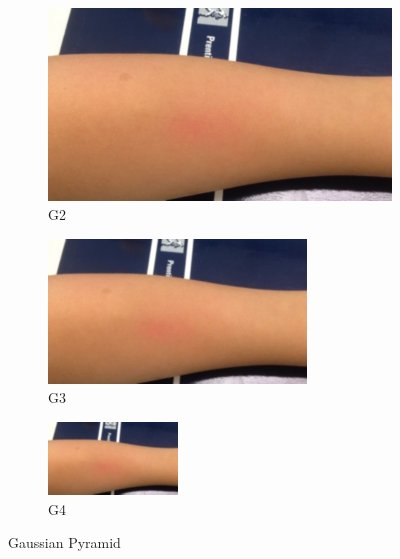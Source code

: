 \begin{figure}[!h]
\begin{subfigure}{.3\textwidth}
  \centering
  \includegraphics[scale=0.16]{img/eulerian/sample/1}
  \caption{G2}
  \label{fig:sub2}
\end{subfigure}
\begin{subfigure}{.3\textwidth}
  \centering
  \includegraphics[scale=0.16]{img/eulerian/sample/2}
  \caption{G3}
  \label{fig:sub2}
\end{subfigure}
\begin{subfigure}{.3\textwidth}
  \centering
  \includegraphics[scale=0.16]{img/eulerian/sample/3}
  \caption{G4}
  \label{fig:sub2}
\end{subfigure}
\caption{Gaussian Pyramid}
\label{fig:test}
\end{figure}

